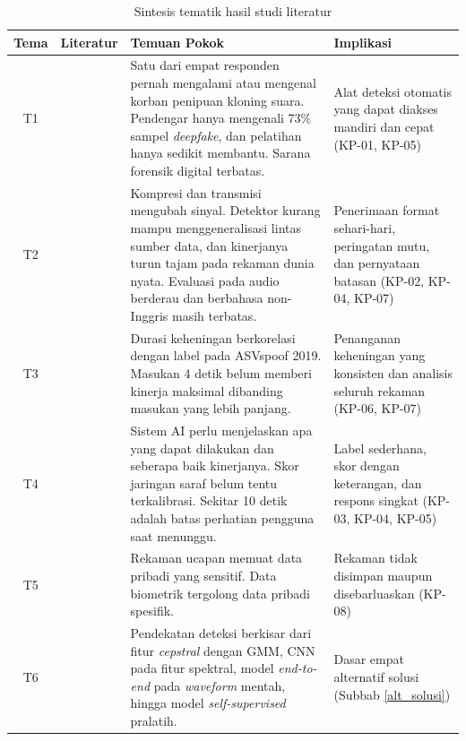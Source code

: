 \begin{table}[t]
  \centering
  \small
  \caption{Sintesis tematik hasil studi literatur}
  \label{tab:sintesis_sl}
  \renewcommand{\arraystretch}{1.25}
  \begin{tabularx}{\textwidth}{| c | p{2.6cm} | X | p{3cm} |}
    \hline
    \textbf{Tema} & \textbf{Literatur} & \textbf{Temuan Pokok} & \textbf{Implikasi} \\
    \hline
    T1 & \autocite{mcafee2023impostor, mai2023warning, Iman_2026, SIP_Law_Firm_2025} & Satu dari empat responden pernah mengalami atau mengenal korban penipuan kloning suara. Pendengar hanya mengenali 73\% sampel \textit{deepfake}, dan pelatihan hanya sedikit membantu. Sarana forensik digital terbatas. & Alat deteksi otomatis yang dapat diakses mandiri dan cepat (KP-01, KP-05) \\
    \hline
    T2 & \autocite{liu2023asvspoof2021, muller2022generalize, almutairi2022review, yi2023survey} & Kompresi dan transmisi mengubah sinyal. Detektor kurang mampu menggeneralisasi lintas sumber data, dan kinerjanya turun tajam pada rekaman dunia nyata. Evaluasi pada audio berderau dan berbahasa non-Inggris masih terbatas. & Penerimaan format sehari-hari, peringatan mutu, dan pernyataan batasan (KP-02, KP-04, KP-07) \\
    \hline
    T3 & \autocite{muller2021silence, muller2022generalize} & Durasi keheningan berkorelasi dengan label pada ASVspoof 2019. Masukan 4 detik belum memberi kinerja maksimal dibanding masukan yang lebih panjang. & Penanganan keheningan yang konsisten dan analisis seluruh rekaman (KP-06, KP-07) \\
    \hline
    T4 & \autocite{amershi2019guidelines, guo2017calibration, nielsen1993response} & Sistem AI perlu menjelaskan apa yang dapat dilakukan dan seberapa baik kinerjanya. Skor jaringan saraf belum tentu terkalibrasi. Sekitar 10 detik adalah batas perhatian pengguna saat menunggu. & Label sederhana, skor dengan keterangan, dan respons singkat (KP-03, KP-04, KP-05) \\
    \hline
    T5 & \autocite{nautsch2019privacy, uupdp2022} & Rekaman ucapan memuat data pribadi yang sensitif. Data biometrik tergolong data pribadi spesifik. & Rekaman tidak disimpan maupun disebarluaskan (KP-08) \\
    \hline
    T6 & \autocite{todisco2017cqcc, lavrentyeva2019stc, tak2021rawnet2, jung2022aasist, tak2022wav2vec} & Pendekatan deteksi berkisar dari fitur \textit{cepstral} dengan GMM, CNN pada fitur spektral, model \textit{end-to-end} pada \textit{waveform} mentah, hingga model \textit{self-supervised} pralatih. & Dasar empat alternatif solusi (Subbab \ref{alt_solusi}) \\
    \hline
  \end{tabularx}
\end{table}

